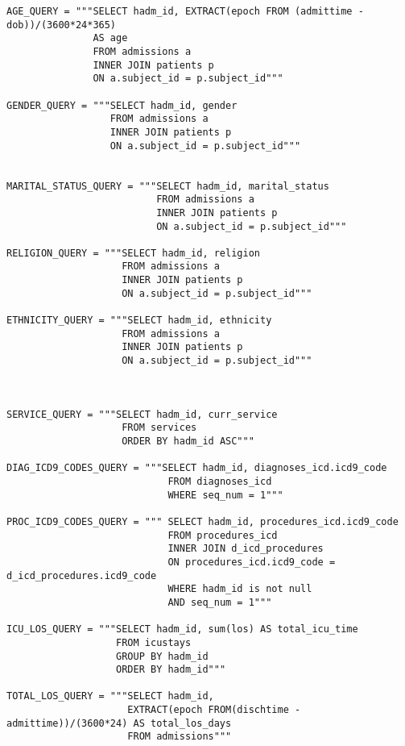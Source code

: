 \documentclass{report}
\begin{document}
\begin{verbatim}
AGE_QUERY = """SELECT hadm_id, EXTRACT(epoch FROM (admittime - dob))/(3600*24*365)
               AS age
               FROM admissions a
               INNER JOIN patients p
               ON a.subject_id = p.subject_id"""
               
GENDER_QUERY = """SELECT hadm_id, gender
                  FROM admissions a
                  INNER JOIN patients p
                  ON a.subject_id = p.subject_id"""
               
               
MARITAL_STATUS_QUERY = """SELECT hadm_id, marital_status 
                          FROM admissions a
                          INNER JOIN patients p
                          ON a.subject_id = p.subject_id"""
                          
RELIGION_QUERY = """SELECT hadm_id, religion 
                    FROM admissions a
                    INNER JOIN patients p
                    ON a.subject_id = p.subject_id"""       

ETHNICITY_QUERY = """SELECT hadm_id, ethnicity 
                    FROM admissions a
                    INNER JOIN patients p
                    ON a.subject_id = p.subject_id"""             

                         
                
SERVICE_QUERY = """SELECT hadm_id, curr_service
                    FROM services
                    ORDER BY hadm_id ASC"""
                    
DIAG_ICD9_CODES_QUERY = """SELECT hadm_id, diagnoses_icd.icd9_code
                            FROM diagnoses_icd 
                            WHERE seq_num = 1"""
                            
PROC_ICD9_CODES_QUERY = """ SELECT hadm_id, procedures_icd.icd9_code
                            FROM procedures_icd 
                            INNER JOIN d_icd_procedures
                            ON procedures_icd.icd9_code = d_icd_procedures.icd9_code
                            WHERE hadm_id is not null
                            AND seq_num = 1"""
                            
ICU_LOS_QUERY = """SELECT hadm_id, sum(los) AS total_icu_time 
                   FROM icustays
                   GROUP BY hadm_id
                   ORDER BY hadm_id"""
                   
TOTAL_LOS_QUERY = """SELECT hadm_id, 
                     EXTRACT(epoch FROM(dischtime - admittime))/(3600*24) AS total_los_days
                     FROM admissions"""
                

\end{verbatim}
\end{document}
